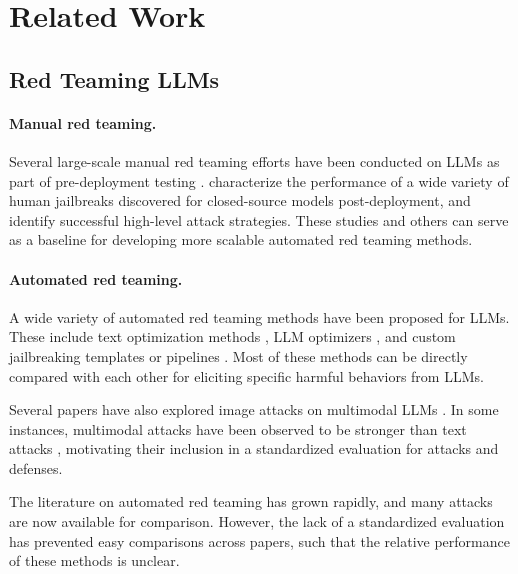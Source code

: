 \section{Related Work}\label{sec:related_work}

\subsection{Red Teaming LLMs}

\paragraph{Manual red teaming.}
Several large-scale manual red teaming efforts have been conducted on LLMs as part of pre-deployment testing \citep{bai2022training, ganguli2022red, achiam2023gpt, touvron2023llama}. \citet{shen2023anything} characterize the performance of a wide variety of human jailbreaks discovered for closed-source models post-deployment, and \citep{wei2023jailbroken} identify successful high-level attack strategies. These studies and others can serve as a baseline for developing more scalable automated red teaming methods.

\paragraph{Automated red teaming.}
A wide variety of automated red teaming methods have been proposed for LLMs. These include text optimization methods \citep{Wallace2019Triggers, guo-etal-2021-gradient, shin-etal-2020-autoprompt, wen2023hard, jones2023automatically, zou2023universal}, LLM optimizers \citep{perez2022red, chao2023jailbreaking, mehrotra2023treeOfAttacks}, and custom jailbreaking templates or pipelines \citep{liu2023autodan, shah2023scalable, casper2023explore, dengmasterkey, zeng2024johnny}. Most of these methods can be directly compared with each other for eliciting specific harmful behaviors from LLMs.

Several papers have also explored image attacks on multimodal LLMs \citep{bagdasaryan2023ab, shayegani2023jailbreak, qi2023visual, bailey2023image}. In some instances, multimodal attacks have been observed to be stronger than text attacks \citep{carlini2023aligned}, motivating their inclusion in a standardized evaluation for attacks and defenses.

The literature on automated red teaming has grown rapidly, and many attacks are now available for comparison. However, the lack of a standardized evaluation has prevented easy comparisons across papers, such that the relative performance of these methods is unclear.

